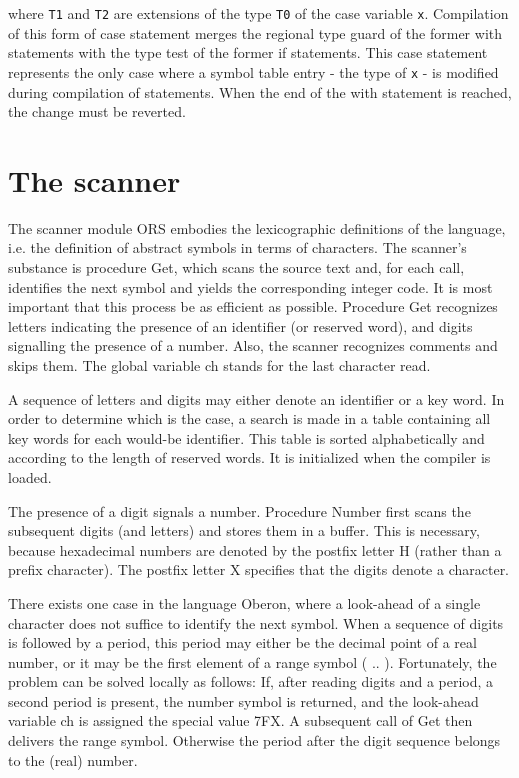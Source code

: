 where \verb|T1| and \verb|T2| are extensions of the type \verb|T0| of the case variable \verb|x|.
Compilation of this form of case statement merges the regional type guard of the former with statements
with the type test of the former if statements. This case statement represents the only case where a
symbol table entry - the type of \verb|x| - is modified during compilation of statements. When the end
of the with statement is reached, the change must be reverted.

\section{The scanner}
The scanner module ORS embodies the lexicographic definitions of the language, i.e. the definition
of abstract symbols in terms of characters. The scanner's substance is procedure Get, which scans
the source text and, for each call, identifies the next symbol and yields the corresponding integer
code. It is most important that this process be as efficient as possible. Procedure Get recognizes
letters indicating the presence of an identifier (or reserved word), and digits signalling the presence
of a number. Also, the scanner recognizes comments and skips them. The global variable ch
stands for the last character read.

A sequence of letters and digits may either denote an identifier or a key word. In order to determine
which is the case, a search is made in a table containing all key words for each would-be identifier.
This table is sorted alphabetically and according to the length of reserved words. It is initialized
when the compiler is loaded.

The presence of a digit signals a number. Procedure Number first scans the subsequent digits (and
letters) and stores them in a buffer. This is necessary, because hexadecimal numbers are denoted
by the postfix letter H (rather than a prefix character). The postfix letter X specifies that the
digits denote a character.

There exists one case in the language Oberon, where a look-ahead of a single character does not
suffice to identify the next symbol. When a sequence of digits is followed by a period, this period
may either be the decimal point of a real number, or it may be the first element of a range symbol (
.. ). Fortunately, the problem can be solved locally as follows: If, after reading digits and a period,
a second period is present, the number symbol is returned, and the look-ahead variable ch is
assigned the special value 7FX. A subsequent call of Get then delivers the range symbol.
Otherwise the period after the digit sequence belongs to the (real) number.

